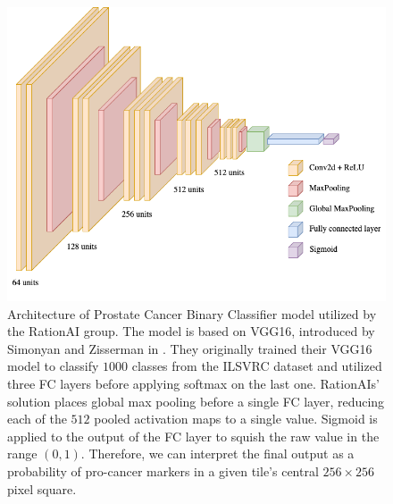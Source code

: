 \begin{figure}
    \begin{center}
    \begin{minipage}{0.75\textwidth}
      \includegraphics[width=\textwidth]{img/nn-arch.png}
    \end{minipage}
    \caption{Architecture of Prostate Cancer Binary Classifier model utilized by the RationAI group. The model is based on VGG16, introduced by Simonyan and Zisserman in \cite{vgg16}. They originally trained their VGG16 model to classify $1000$ classes from the ILSVRC dataset \cite{ilsvrc} and utilized three FC layers before applying softmax on the last one. RationAIs' solution places global max pooling before a single FC layer, reducing each of the $512$ pooled activation maps to a single value. Sigmoid is applied to the output of the FC layer to squish the raw value in the range $(0, 1)$. Therefore, we can interpret the final output as a probability of pro-cancer markers in a given tile's central $256 \times 256$ pixel square.}
    \label{fig:rationai-vgg16}
    \end{center}
\end{figure}

